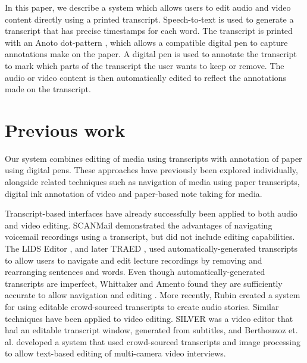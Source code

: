 In this paper, we describe a system which allows users to edit audio and video
content directly using a printed transcript.  Speech-to-text is used to
generate a transcript that has precise timestamps for each word.  The
transcript is printed with an Anoto dot-pattern \cite{Fahraeus2003}, which
allows a compatible digital pen to capture annotations make on the paper.  A
digital pen is used to annotate the transcript to mark which parts of the
transcript the user wants to keep or remove.  The audio or video content is
then automatically edited to reflect the annotations made on the transcript.




\section{Previous work}
Our system combines editing of media using transcripts with annotation of paper
using digital pens. These approaches have previously been explored
individually, alongside related techniques such as navigation of media using
paper transcripts, digital ink annotation of video and paper-based note taking
for media.

Transcript-based interfaces have already successfully been applied to both audio
and video editing. SCANMail \cite{Whittaker2002} demonstrated the advantages of
navigating voicemail recordings using a transcript, but did not include editing
capabilities.  The LIDS Editor \cite{Apperley2002}, and later TRAED
\cite{Masoodian2006}, used automatically-generated transcripts to allow users
to navigate and edit lecture recordings by removing and rearranging sentences
and words. Even though automatically-generated transcripts are
imperfect, Whittaker and Amento found they are sufficiently accurate to allow
navigation and editing \cite{Whittaker2004}.  More recently, Rubin
\cite{Rubin2013} created a system for using editable crowd-sourced transcripts
to create audio stories.  Similar techniques have been applied to video
editing. SILVER \cite{Casares2002} was a video editor that had an editable
transcript window, generated from subtitles, and Berthouzoz et. al.
\cite{Berthouzoz2012} developed a system that used crowd-sourced transcripts and
image processing to allow text-based editing of multi-camera video interviews.

